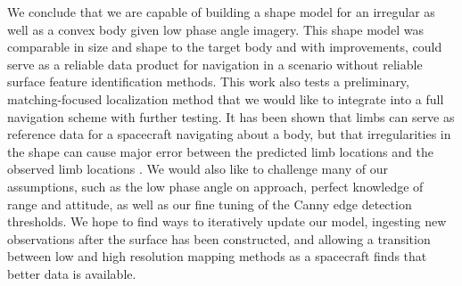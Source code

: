 We conclude that we are capable of building a shape model for an irregular as well as a convex body given low phase angle imagery. This shape model was comparable in size and shape to the target body and with improvements, could serve as a reliable data product for navigation in a scenario without reliable surface feature identification methods. This work also tests a preliminary, matching-focused localization method that we would like to integrate into a full navigation scheme with further testing. It has been shown that limbs can serve as reference data for a spacecraft navigating about a body, but that irregularities in the shape can cause major error between the predicted limb locations and the observed limb locations \cite{Liounis}. We would also like to challenge many of our assumptions, such as the low phase angle on approach, perfect knowledge of range and attitude, as well as our fine tuning of the Canny edge detection thresholds. We hope to find ways to iteratively update our model, ingesting new observations after the surface has been constructed, and allowing a transition between low and high resolution mapping methods as a spacecraft finds that better data is available.



